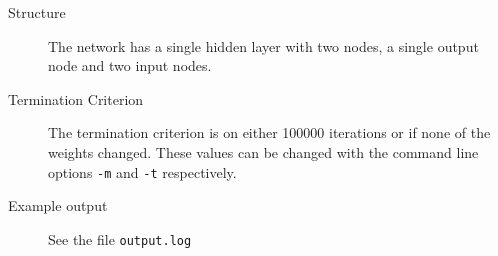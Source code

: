 \documentclass[10pt,a4paper,boxed]{hmcpset}
\begin{document}
		\begin{problem}
			\begin{description}
				\item[Structure] The network has a single hidden layer with two nodes, a
					single output node and two input nodes.
				\item[Termination Criterion] The termination criterion is on either
					100000 iterations or if none of the weights changed. These values can
					be changed with the command line options \verb$-m$ and \verb$-t$
					respectively.
				\item[Example output] See the file \verb$output.log$
			\end{description}
		\end{problem}
		

		\begin{problem}[4. Distances]
		\end{problem}
\end{document}
